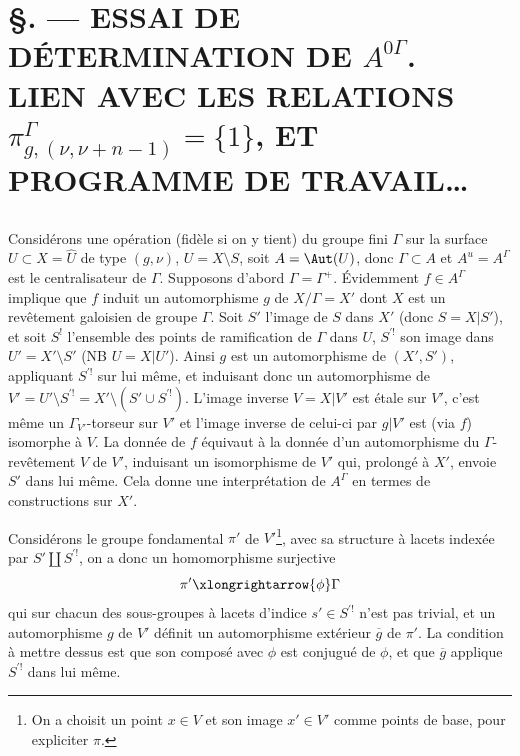

\chapter*{\S {}. --- ESSAI DE DÉTERMINATION DE $A^{0\Gamma}$. \\ LIEN AVEC LES RELATIONS ${\pi^\Gamma_{g,(\nu,\nu+n-1)}} =\{1\}$, ET PROGRAMME DE TRAVAIL\dots}\thispagestyle{empty}
\label{sec:24}
\section*{}

Considérons une opération (fidèle si on y tient) du groupe fini $\Gamma$ sur la surface $U \subset  X = \widehat{U}$ de type $(g, \nu)$, $U = X \setminus S$, soit $A = \Aut(U)$, donc $\Gamma \subset  A$ et $A^u = A^\Gamma$ est le centralisateur de $\Gamma$. Supposons d'abord $\Gamma = \Gamma^+$. Évidemment $f \in A^\Gamma$ implique que $f$ induit un automorphisme $g$ de $X/\Gamma = X'$ dont $X$ est un revêtement galoisien de groupe $\Gamma$. Soit $S'$ l'image de $S$ dans $X'$ (donc $S = X|S'$), et soit $S^!$ l'ensemble des points de ramification de $\Gamma$ dans $U$, $S^{'!}$ son image dans $U' = X' \setminus S'$ (NB $U = X|U'$). Ainsi $g$ est un automorphisme de $(X', S')$, appliquant $S^{'!}$ sur lui même, et induisant donc un automorphisme de $V' = U' \setminus S^{'!} = X' \setminus (S' \cup S^{'!})$. L'image inverse $V = X | V'$ est étale sur $V'$, c'est même un $\Gamma_{V'}$-torseur sur $V'$ et l'image inverse de celui-ci par $g |{V'}$ est (via $f$) isomorphe à $V$. La donnée de $f$ équivaut à la donnée d'un automorphisme du $\Gamma$-revêtement $V$ de $V'$, induisant un isomorphisme de $V'$ qui, prolongé à $X'$, envoie $S'$ dans lui même. Cela donne une interprétation de $A^\Gamma$ en termes de constructions sur $X'$.

Considérons le groupe fondamental $\pi'$ de $V'$\footnote{On a choisit un point $x \in V$ et son image $x' \in V'$ comme points de base, pour expliciter $\pi$.}, avec sa structure à lacets indexée par $S' \amalg S^{'!}$, on a donc un homomorphisme surjective
$$
\pi' \xlongrightarrow{\phi} \Gamma
$$
qui sur chacun des sous-groupes à lacets d'indice $s' \in S^{'!}$ n'est pas trivial, et un automorphisme $g$ de $V'$ définit un automorphisme extérieur $\overline{g}$ de $\pi'$. La condition à mettre dessus est que son composé avec $\phi$ est conjugué de $\phi$, et que $\overline{g}$ applique $S^{'!}$ dans lui même.

